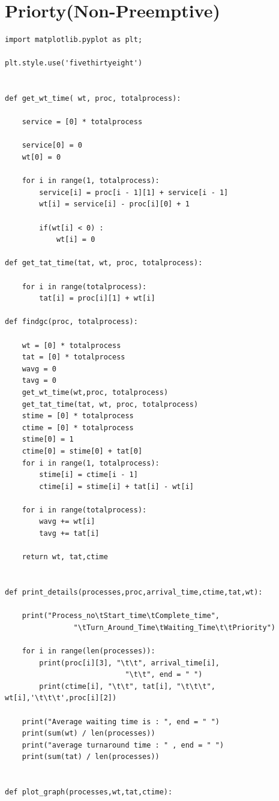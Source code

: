 \documentclass[11pt,a4paper]{report}
\begin{document}
\section{Priorty(Non-Preemptive)}
\begin{lstlisting}[columns=fullflexible,caption=Priorty(Non-Preemptive) Source code,breaklines=true,postbreak=\mbox{\textcolor{red}{$\hookrightarrow$}\space},]
import matplotlib.pyplot as plt;

plt.style.use('fivethirtyeight')


def get_wt_time( wt, proc, totalprocess):  
	
	service = [0] * totalprocess
	
	service[0] = 0
	wt[0] = 0
	
	for i in range(1, totalprocess):  
		service[i] = proc[i - 1][1] + service[i - 1]  
		wt[i] = service[i] - proc[i][0] + 1
	
		if(wt[i] < 0) :      
			wt[i] = 0
			
def get_tat_time(tat, wt, proc, totalprocess):  
	
	for i in range(totalprocess): 
		tat[i] = proc[i][1] + wt[i]  
	
def findgc(proc, totalprocess): 
		
	wt = [0] * totalprocess
	tat = [0] * totalprocess
	wavg = 0
	tavg = 0
	get_wt_time(wt,proc, totalprocess)  
	get_tat_time(tat, wt, proc, totalprocess)  
	stime = [0] * totalprocess
	ctime = [0] * totalprocess
	stime[0] = 1
	ctime[0] = stime[0] + tat[0] 
	for i in range(1, totalprocess):  
		stime[i] = ctime[i - 1]  
		ctime[i] = stime[i] + tat[i] - wt[i]  

	for i in range(totalprocess): 
		wavg += wt[i]  
		tavg += tat[i]  

	return wt, tat,ctime


def print_details(processes,proc,arrival_time,ctime,tat,wt):
		
	print("Process_no\tStart_time\tComplete_time", 
				"\tTurn_Around_Time\tWaiting_Time\t\tPriority") 
	
	for i in range(len(processes)):
		print(proc[i][3], "\t\t", arrival_time[i],  
							"\t\t", end = " ") 
		print(ctime[i], "\t\t", tat[i], "\t\t\t", wt[i],'\t\t\t',proc[i][2])  
	
	print("Average waiting time is : ", end = " ") 
	print(sum(wt) / len(processes)) 
	print("average turnaround time : " , end = " ") 
	print(sum(tat) / len(processes)) 
	

def plot_graph(processes,wt,tat,ctime):


\end{lstlisting}
\end{document}
